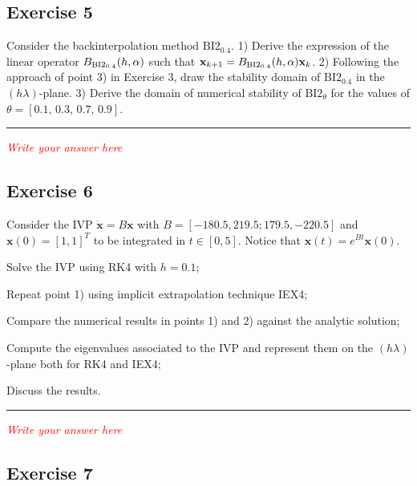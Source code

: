 \documentclass[11pt,a4paper,oneside]{article}
\renewcommand{\vec}[1]{\mathbf{#1}}
\newcommand{\tr}{\textcolor{red}}
\begin{document}
\subsection*{Exercise 5}
Consider the backinterpolation method $\textrm{BI2}_{0.4}$. 1) Derive the expression of the 
linear operator $B_{\rm BI2_{0.4}}(h,\alpha)$ such that $\vec x_{k+1} = B_{\rm BI2_{0.4}}(h,\alpha) \vec x_k$. 2) 
Following the approach of point 3) in Exercise 3, draw the stability domain of 
$\textrm{BI2}_{0.4}$ in the $(h\lambda)$-plane. 3) Derive the domain of numerical stability 
of $\textrm{BI2}_{\theta}$ for the values of $\theta = [0.1,\, 0.3,\, 0.7,\, 0.9]$.

\medskip \hrule \medskip

\tr{\textit{Write your answer here}}

\subsection*{Exercise 6}

Consider the IVP $\dot{\vec x} = B \vec x$ with $B =[-180.5, 219.5; 179.5, -220.5]$ and $\vec{x}(0)=[1, 1]^T$ to be integrated in $t\in[0, 5]$. Notice that $\vec{x}(t)=e^{Bt}\vec{x}(0)$.
\begin{enumerate*}[label=\arabic*)]
    \item Solve the IVP using RK4 with $h=0.1$;
    \item Repeat point 1) using implicit extrapolation technique IEX4;
    \item Compare the numerical results in points 1) and 2) against the analytic solution;
    \item Compute the eigenvalues associated to the IVP and represent them on the $(h\lambda)$-plane both for RK4 and IEX4;
    \item Discuss the results.
\end{enumerate*}

\medskip \hrule \medskip

\tr{\textit{Write your answer here}}


\subsection*{Exercise 7}
\end{document}
